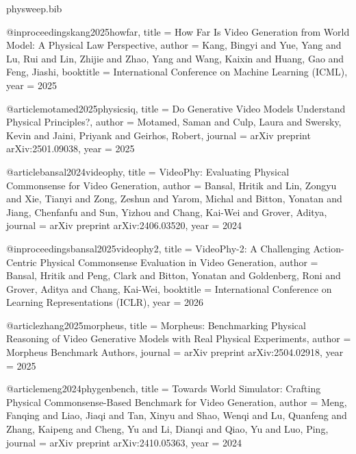 \begin{filecontents}{physweep.bib}

@inproceedings{kang2025howfar,
  title     = {How Far Is Video Generation from World Model: A Physical Law Perspective},
  author    = {Kang, Bingyi and Yue, Yang and Lu, Rui and Lin, Zhijie and Zhao, Yang and Wang, Kaixin and Huang, Gao and Feng, Jiashi},
  booktitle = {International Conference on Machine Learning (ICML)},
  year      = {2025}
}

@article{motamed2025physicsiq,
  title   = {Do Generative Video Models Understand Physical Principles?},
  author  = {Motamed, Saman and Culp, Laura and Swersky, Kevin and Jaini, Priyank and Geirhos, Robert},
  journal = {arXiv preprint arXiv:2501.09038},
  year    = {2025}
}

@article{bansal2024videophy,
  title   = {{VideoPhy}: Evaluating Physical Commonsense for Video Generation},
  author  = {Bansal, Hritik and Lin, Zongyu and Xie, Tianyi and Zong, Zeshun and Yarom, Michal and Bitton, Yonatan and Jiang, Chenfanfu and Sun, Yizhou and Chang, Kai-Wei and Grover, Aditya},
  journal = {arXiv preprint arXiv:2406.03520},
  year    = {2024}
}

@inproceedings{bansal2025videophy2,
  title     = {{VideoPhy-2}: A Challenging Action-Centric Physical Commonsense Evaluation in Video Generation},
  author    = {Bansal, Hritik and Peng, Clark and Bitton, Yonatan and Goldenberg, Roni and Grover, Aditya and Chang, Kai-Wei},
  booktitle = {International Conference on Learning Representations (ICLR)},
  year      = {2026}
}

@article{zhang2025morpheus,
  title   = {{Morpheus}: Benchmarking Physical Reasoning of Video Generative Models with Real Physical Experiments},
  author  = {{Morpheus Benchmark Authors}},
  journal = {arXiv preprint arXiv:2504.02918},
  year    = {2025}
}

@article{meng2024phygenbench,
  title   = {Towards World Simulator: Crafting Physical Commonsense-Based Benchmark for Video Generation},
  author  = {Meng, Fanqing and Liao, Jiaqi and Tan, Xinyu and Shao, Wenqi and Lu, Quanfeng and Zhang, Kaipeng and Cheng, Yu and Li, Dianqi and Qiao, Yu and Luo, Ping},
  journal = {arXiv preprint arXiv:2410.05363},
  year    = {2024}
}


\end{filecontents}
